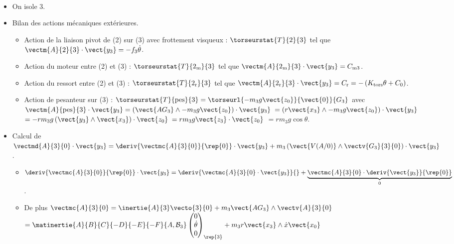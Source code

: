 \begin{corrige} ~\\
\begin{itemize}
\item On isole 3.

\item Bilan des actions mécaniques extérieures.
\begin{itemize}
\item Action de la liaison pivot de (2) sur (3) 	avec frottement visqueux : $\torseurstat{T}{2}{3}$ tel que $\vectm{A}{2}{3} \cdot \vect{y_3} =  -f_3 \dot{\theta} $.
\item Action du moteur entre (2) et (3) : $\torseurstat{T}{2_{\text{m}}}{3}$ tel que $\vectm{A}{2_{\text{m}}}{3} \cdot \vect{y_3} = C_{\text{m3}} $. 
\item Action du ressort entre (2) et (3) : $\torseurstat{T}{2_{\text{r}}}{3}$ tel que $\vectm{A}{2_{\text{r}}}{3} \cdot \vect{y_3} = C_{\text{r}}= -\left(K_{\text{tors}}\theta + C_0\right) $. 
\item Action de pesanteur sur (3) : $\torseurstat{T}{\text{pes}}{3} = \torseurl{-m_3g \vect{z_0}}{\vect{0}}{G_3}$ avec 
$\vectm{A}{\text{pes}}{3} \cdot \vect{y_3} = \left(\vect{AG_3} \wedge -m_3g \vect{z_0} \right) \cdot \vect{y_3}$
$= \left(r  \vect{x_3} \wedge -m_3g \vect{z_0} \right) \cdot \vect{y_3}$
$= -rm_3g\left(  \vect{y_3} \wedge \vect{x_3} \right) \cdot \vect{z_0} $
$= rm_3g\vect{z_3} \cdot \vect{z_0} $
$= rm_3g\cos \theta $.
\end{itemize}

\item Calcul de $\vectmd{A}{3}{0}\cdot \vect{y_3} = \deriv{\vectmc{A}{3}{0}}{\rep{0}}\cdot \vect{y_3} + m_3 \left(\vect{V(A/0)}\wedge\vectv{G_3}{3}{0}\right)\cdot \vect{y_3}$.
\begin{itemize}

\item  $\deriv{\vectmc{A}{3}{0}}{\rep{0}}\cdot \vect{y_3} =  \deriv{\vectmc{A}{3}{0}\cdot \vect{y_3}}{}+ \underbrace{\vectmc{A}{3}{0}\cdot \deriv{\vect{y_3}}{\rep{0}}}_{0}$.  

\item De plus $\vectmc{A}{3}{0} = \inertie{A}{3} \vecto{3}{0}  + m_3 \vect{AG_3}\wedge \vectv{A}{3}{0}$ 
$= \matinertie{A}{B}{C}{-D}{-E}{-F}{A,\mathcal{B}_3} \begin{pmatrix} 0  \\ \dot{\theta} \\ 0 \end{pmatrix}_{\rep{3}}
+ m_3 r\vect{x_3}\wedge \dot{x}\vect{x_0} $ 


\end{itemize}
\end{itemize}
\end{corrige}
